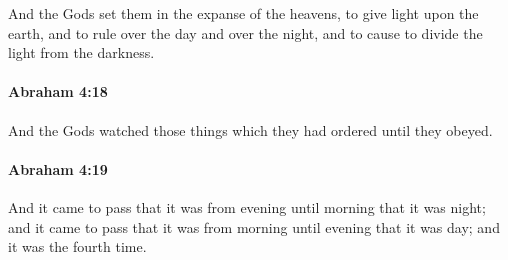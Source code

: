 			And the Gods set them in the expanse of the heavens, to give light upon the earth, and to rule over the day and over the night, and to cause to divide the light from the darkness.


		\paragraph{Abraham 4:18} %
			\label{ABRAHAM-4-18}

			And the Gods watched those things which they had ordered until they obeyed.


		\paragraph{Abraham 4:19} %
			\label{ABRAHAM-4-19}

			And it came to pass that it was from evening until morning that it was night; and it came to pass that it was from morning until evening that it was day; and it was the fourth time.

